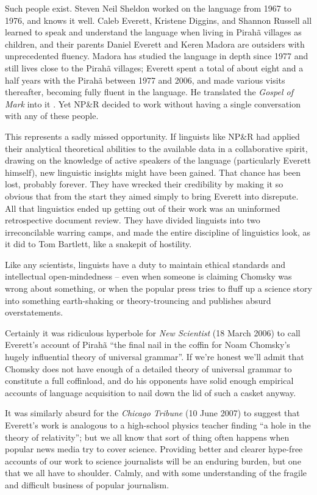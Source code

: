 \documentclass[output=paper,colorlinks,citecolor=brown
]{langscibook}
\begin{document}
Such people exist. Steven Neil Sheldon worked on the language from
1967 to 1976, and knows it well. Caleb Everett, Kristene Diggins,
and Shannon Russell all learned to speak and understand the language
when living in Pirah{\~a} villages as children, and their parents
Daniel Everett and Keren Madora are outsiders with unprecedented
fluency. Madora has studied the language in depth since 1977 and
still lives close to the Pirah{\~a} villages; Everett spent a total
of about eight and a half years with the Pirah{\~a} between 1977
and 2006, and made various visits thereafter, becoming fully fluent
in the language. He translated the \textit{Gospel of Mark} into it
\citep{Everett86Mark}. Yet NP\&R decided to work without having a
single conversation with any of these people.

This represents a sadly missed opportunity. If linguists like NP\&R
had applied their analytical theoretical abilities to the available
data in a collaborative spirit, drawing on the knowledge of active
speakers of the language (particularly Everett himself), new linguistic
insights might have been gained. That chance has been lost, probably
forever. They have wrecked their credibility by making it so obvious
that from the start they aimed simply to bring Everett into disrepute.
All that linguistics ended up getting out of their work was an
uninformed retrospective document review. They have divided linguists
into two irreconcilable warring camps, and made the entire discipline
of linguistics look, as it did to Tom Bartlett, like a snakepit of
hostility.

Like any scientists, linguists have a duty to maintain ethical
standards and intellectual open-mindedness -- even when someone is
claiming Chomsky was wrong about something, or when the popular
press tries to fluff up a science story into something earth-shaking
or theory-trouncing and publishes absurd overstatements.

Certainly it was ridiculous hyperbole for
\textit{New Scientist} (18 March 2006)
to call Everett's account of Pirah{\~a} ``the final nail in the
coffin for Noam Chomsky's hugely influential theory of universal
grammar''. If we're honest we'll admit that Chomsky does not have
enough of a detailed theory of universal grammar to constitute a full
coffinload, and do his opponents have solid enough empirical accounts
of language acquisition to nail down the lid of such a casket anyway.

It was similarly absurd for the
\textit{Chicago Tribune} (10 June 2007)
to suggest that Everett's work is analogous to a high-school physics
teacher finding ``a hole in the theory of relativity''; but we all know
that sort of thing often happens when popular news media try to cover
science. Providing better and clearer hype-free accounts of our work
to science journalists will be an enduring burden, but one that we
all have to shoulder. Calmly, and with some understanding of the
fragile and difficult business of popular journalism.
\end{document}
